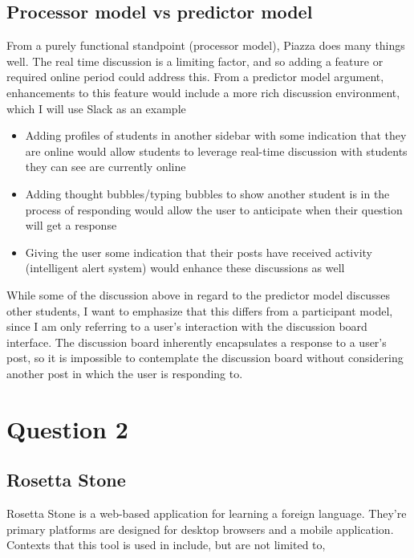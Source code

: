 \subsection{Processor model vs predictor model}

From a purely functional standpoint (processor model), Piazza does many things well. The real time discussion is a limiting factor, and so adding a feature or required online period could address this. From a predictor model argument, enhancements to this feature would include a more rich discussion environment, which I will use Slack as an example

\begin{itemize}
\item
  Adding profiles of students in another sidebar with some indication that they are online would allow students to leverage real-time discussion with students they can see are currently online
\item
  Adding thought bubbles/typing bubbles to show another student is in the process of responding would allow the user to anticipate when their question will get a response
\item
  Giving the user some indication that their posts have received activity (intelligent alert system) would enhance these discussions as well
\end{itemize}

While some of the discussion above in regard to the predictor model discusses other students, I want to emphasize that this differs from a participant model, since I am only referring to a user's interaction with the discussion board interface. The discussion board inherently encapsulates a response to a user's post, so it is impossible to contemplate the discussion board without considering another post in which the user is responding to.

\section{Question 2}

\subsection{Rosetta Stone}

Rosetta Stone is a web-based application for learning a foreign language. They're primary platforms are designed for desktop browsers and a mobile application. Contexts that this tool is used in include, but are not limited to,

